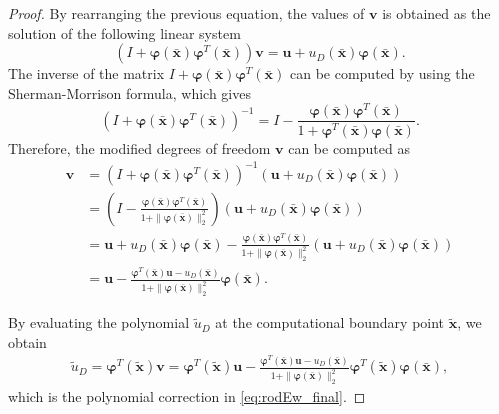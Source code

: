 \documentclass[10pt,a4paper]{amsart}
\renewcommand{\phi}{\varphi}
\begin{document}
\begin{proof}
    By rearranging the previous equation, the values of $\boldsymbol{v}$ is obtained as the solution of the following linear system
\begin{equation}
    (I + \boldsymbol{\phi}(\bar{\boldsymbol{x}}) \boldsymbol{\phi}^T(\bar{\boldsymbol{x}})) \boldsymbol{v} = \boldsymbol{u} + u_D(\bar{\boldsymbol{x}}) \boldsymbol{\phi}(\bar{\boldsymbol{x}}).
\end{equation}
The inverse of the matrix $I + \boldsymbol{\phi}(\bar{\boldsymbol{x}}) \boldsymbol{\phi}^T(\bar{\boldsymbol{x}})$ can be computed by using the Sherman-Morrison formula, which gives
\begin{equation}
    (I + \boldsymbol{\phi}(\bar{\boldsymbol{x}}) \boldsymbol{\phi}^T(\bar{\boldsymbol{x}}))^{-1} = I - \frac{\boldsymbol{\phi}(\bar{\boldsymbol{x}}) \boldsymbol{\phi}^T(\bar{\boldsymbol{x}})}{1 + \boldsymbol{\phi}^T(\bar{\boldsymbol{x}}) \boldsymbol{\phi}(\bar{\boldsymbol{x}})}.
\end{equation}
Therefore, the modified degrees of freedom $\boldsymbol{v}$ can be computed as
\begin{equation}
    \begin{split}
    \boldsymbol{v} &= (I + \boldsymbol{\phi}(\bar{\boldsymbol{x}}) \boldsymbol{\phi}^T(\bar{\boldsymbol{x}}))^{-1} (\boldsymbol{u} + u_D(\bar{\boldsymbol{x}}) \boldsymbol{\phi}(\bar{\boldsymbol{x}})) \\
    &= \left( I - \frac{\boldsymbol{\phi}(\bar{\boldsymbol{x}}) \boldsymbol{\phi}^T(\bar{\boldsymbol{x}})}{1 + \|\boldsymbol{\phi}(\bar{\boldsymbol{x}})\|^2_2} \right) (\boldsymbol{u} + u_D(\bar{\boldsymbol{x}}) \boldsymbol{\phi}(\bar{\boldsymbol{x}})) \\
    &= \boldsymbol{u} + u_D(\bar{\boldsymbol{x}}) \boldsymbol{\phi}(\bar{\boldsymbol{x}}) - \frac{\boldsymbol{\phi}(\bar{\boldsymbol{x}}) \boldsymbol{\phi}^T(\bar{\boldsymbol{x}})}{1 + \|\boldsymbol{\phi}(\bar{\boldsymbol{x}})\|^2_2} (\boldsymbol{u} + u_D(\bar{\boldsymbol{x}}) \boldsymbol{\phi}(\bar{\boldsymbol{x}})) \\
    &= \boldsymbol{u} - \frac{\boldsymbol{\phi}^T(\bar{\boldsymbol{x}})\boldsymbol{u} - u_D(\bar{\boldsymbol{x}})}{1 + \|\boldsymbol{\phi}(\bar{\boldsymbol{x}})\|^2_2} \boldsymbol{\phi}(\bar{\boldsymbol{x}}) .
    \end{split}
\end{equation}

By evaluating the polynomial $\tilde u_D$ at the computational boundary point $\tilde{\boldsymbol{x}}$, we obtain
\begin{equation}
    \begin{split}
    \tilde u_D = \boldsymbol{\phi}^T(\tilde{\boldsymbol{x}}) \boldsymbol{v} = \boldsymbol{\phi}^T(\tilde{\boldsymbol{x}}) \boldsymbol{u} - \frac{\boldsymbol{\phi}^T(\bar{\boldsymbol{x}})\boldsymbol{u} - u_D(\bar{\boldsymbol{x}})}{1 + \|\boldsymbol{\phi}(\bar{\boldsymbol{x}})\|^2_2} \boldsymbol{\phi}^T(\tilde{\boldsymbol{x}}) \boldsymbol{\phi}(\bar{\boldsymbol{x}}) , 
    \end{split}
\end{equation}
which is the polynomial correction in \eqref{eq:rodEw_final}.
\end{proof}
\end{document}
